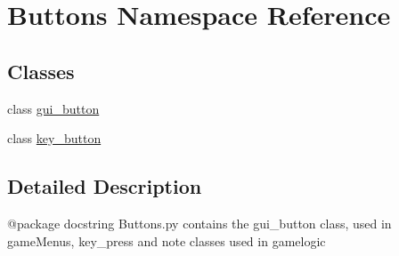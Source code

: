 \hypertarget{namespace_buttons}{}\section{Buttons Namespace Reference}
\label{namespace_buttons}
\subsection*{Classes}
\begin{DoxyCompactItemize}
\item 
class \hyperlink{class_buttons_1_1gui__button}{gui\+\_\+button}
\item 
class \hyperlink{class_buttons_1_1key__button}{key\+\_\+button}
\end{DoxyCompactItemize}


\subsection{Detailed Description}
\begin{DoxyVerb}@package docstring
Buttons.py contains the gui_button class, used in gameMenus, key_press and note classes
used in gamelogic\end{DoxyVerb}
 